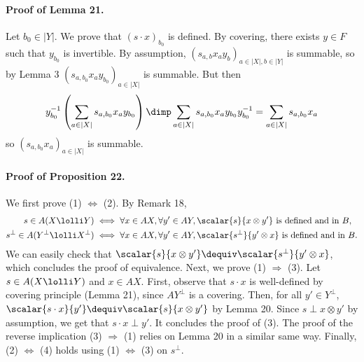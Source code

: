 \paragraph{Proof of Lemma 21.} Let $b_0\in|Y|$. We prove that $(s\cdot x)_{b_0}$ is defined. By covering, there exists $y\in F$ such that $y_{b_0}$ is invertible. By assumption, $(s_{a,b}x_ay_b)_{a\in|X|,b\in|Y|}$ is summable, so by Lemma 3 $(s_{a,b_0}x_ay_{b_0})_{a\in|X|}$ is summable. But then
\[y_{b_0}^{-1}\left(\sum_{a\in|X|}s_{a,b_0}x_ay_{b_0}\right)\dimp\sum_{a\in|X|}s_{a,b_0}x_ay_{b_0}y_{b_0}^{-1}=\sum_{a\in|X|}s_{a,b_0}x_a\]
so $(s_{a,b_0}x_a)_{a\in|X|}$ is summable.
\paragraph{Proof of Proposition 22.} We first prove (1) $\Leftrightarrow$ (2). By Remark 18,
\begin{align*}s\in A(X\lolli Y)&\iff\forall x\in AX,\forall y'\in AY,\scalar{s}{x\otimes y'}\text{ is defined and in }B,\\s^\perp\in A(Y^\perp\lolli X^\perp)&\iff\forall x\in AX,\forall y'\in AY,\scalar{s^\perp}{y'\otimes x}\text{ is defined and in }B.\end{align*}
We can easily check that $\scalar{s}{x\otimes y'}\dequiv\scalar{s^\perp}{y'\otimes x}$, which concludes the proof of equivalence. Next, we prove (1) $\Rightarrow$ (3). Let $s\in A(X\lolli Y)$ and $x\in AX$. First, observe that $s\cdot x$ is well-defined by covering principle (Lemma 21), since $AY^\perp$ is a covering. Then, for all $y'\in Y^\perp$, $\scalar{s\cdot x}{y'}\dequiv\scalar{s}{x\otimes y'}$ by Lemma 20. Since $s\perp x\otimes y'$ by assumption, we get that $s\cdot x\perp y'$. It concludes the proof of (3). The proof of the reverse implication (3) $\Rightarrow$ (1) relies on Lemma 20 in a similar same way. Finally, (2) $\Leftrightarrow$ (4) holds using (1) $\Leftrightarrow$ (3) on $s^\perp$.
